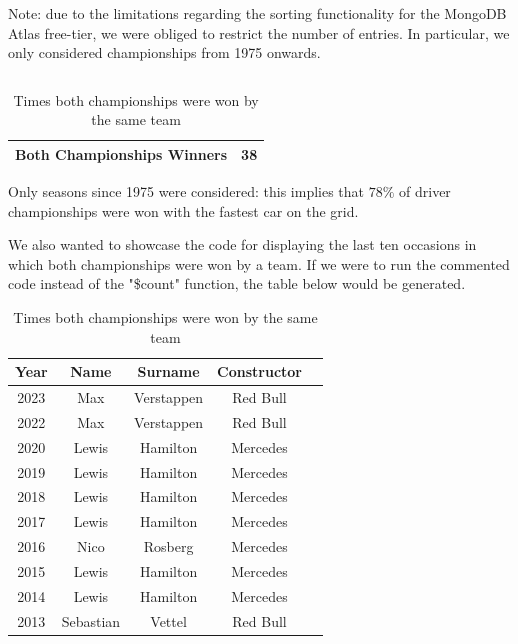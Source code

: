 \documentclass{Configuration_Files/PoliMi3i_thesis}
\begin{document}
Note: due to the limitations regarding the sorting functionality for the MongoDB Atlas free-tier, we were obliged to restrict the number of entries. In particular, we only considered championships from 1975 onwards.

\vspace{0.5cm}
\inputminted[frame=single,framesep=10pt,breaklines]{python}{formula1/queries/query9.py}

\vspace{0.5cm}
\begin{table}[!h]
    \centering
    \begin{tabular}{|c|c|}
        \hline
        \textbf{Both Championships Winners}
        & 38 \\
        \hline
    \end{tabular}
    \caption{Times both championships were won by the same team}
\end{table}

Only seasons since 1975 were considered: this implies that $78\%$ of driver championships were won with the fastest car on the grid.

We also wanted to showcase the code for displaying the last ten occasions in which both championships were won by a team. If we were to run the commented code instead of the "\$count" function, the table below would be generated.

\vspace{0.5cm}
\begin{table}[!h]
    \centering
    \begin{tabular}{|c|c|c|c|c|}
        \hline
        \textbf{Year} & \textbf{Name} & \textbf{Surname} & \textbf{Constructor} \\
        \hline
        2023 & Max & Verstappen & Red Bull \\
        2022 & Max & Verstappen & Red Bull \\
        2020 & Lewis & Hamilton & Mercedes \\
        2019 & Lewis & Hamilton & Mercedes \\
        2018 & Lewis & Hamilton & Mercedes \\
        2017 & Lewis & Hamilton & Mercedes \\
        2016 & Nico & Rosberg & Mercedes \\
        2015 & Lewis & Hamilton & Mercedes \\
        2014 & Lewis & Hamilton & Mercedes \\
        2013 & Sebastian & Vettel & Red Bull \\
        \hline
    \end{tabular}
    \caption{Times both championships were won by the same team}
\end{table}
\end{document}
